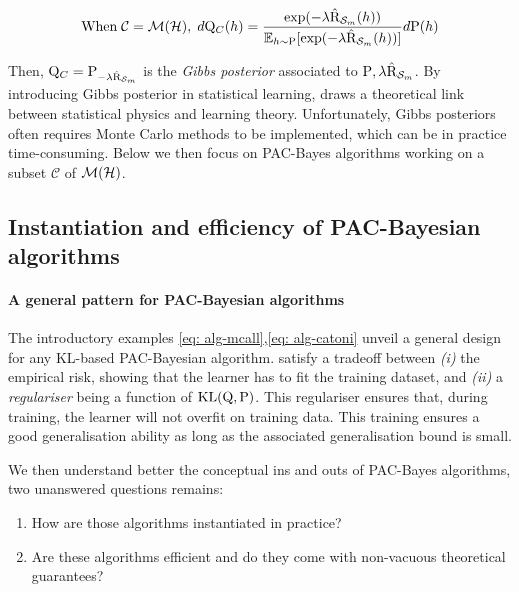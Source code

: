 \begin{align}
  \label{eq: catoni-gibbs}
  \text{When}\; \mathcal{C}= \mathcal{M}(\mathcal{H}),\; d\mathrm{Q}_{C}(h) = \frac{\exp(-\lambda \hat{\text{R}}_{\mathcal{S}_m}(h))}{\mathbb{E}_{h\sim\mathrm{P}}[\exp(-\lambda \hat{\text{R}}_{\mathcal{S}_m}(h))]} d\mathrm{P}(h)
\end{align}

Then, $\mathrm{Q}_{C} = \mathrm{P}_{-\lambda \hat{\text{R}}_{\mathcal{S}_m}}$ is the \emph{Gibbs posterior} associated to $\mathrm{P},\lambda\hat{\text{R}}_{\mathcal{S}_m}$. By introducing Gibbs posterior in statistical learning, \citet{catoni2007pac} draws a theoretical link between statistical physics and learning theory. Unfortunately, Gibbs posteriors often requires Monte Carlo methods to be implemented, which can be in practice time-consuming. Below we then focus on PAC-Bayes algorithms working on a subset $\mathcal{C}$ of $\mathcal{M}(\mathcal{H})$. 

\subsection*{Instantiation and efficiency of PAC-Bayesian algorithms}

\paragraph{A general pattern for PAC-Bayesian algorithms}

The introductory examples \eqref{eq: alg-mcall},\eqref{eq: alg-catoni} unveil a general design for any KL-based PAC-Bayesian algorithm. satisfy a tradeoff between \textit{(i)} the empirical risk, showing that the learner has to fit the training dataset, and \textit{(ii)} a \emph{regulariser} being a function of $\mathrm{KL}(\mathrm{Q},\mathrm{P})$. This regulariser ensures that, during training, the learner will not overfit on training data. This training ensures a good generalisation ability as long as the associated generalisation bound is small. 

We then understand better the conceptual ins and outs of PAC-Bayes algorithms, two unanswered questions remains: 

\begin{enumerate}
  \item How are those algorithms instantiated in practice?
  \item Are these algorithms efficient and do they come with non-vacuous theoretical guarantees? 
\end{enumerate}

